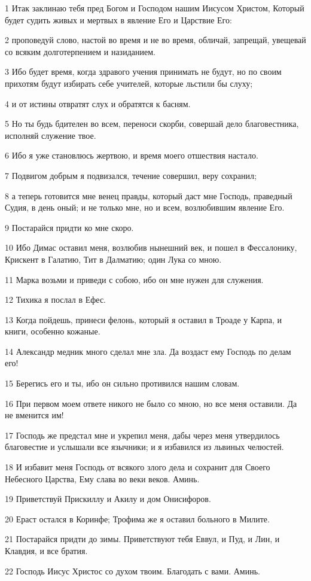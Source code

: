 \par 1 Итак заклинаю тебя пред Богом и Господом нашим Иисусом Христом, Который будет судить живых и мертвых в явление Его и Царствие Его:
\par 2 проповедуй слово, настой во время и не во время, обличай, запрещай, увещевай со всяким долготерпением и назиданием.
\par 3 Ибо будет время, когда здравого учения принимать не будут, но по своим прихотям будут избирать себе учителей, которые льстили бы слуху;
\par 4 и от истины отвратят слух и обратятся к басням.
\par 5 Но ты будь бдителен во всем, переноси скорби, совершай дело благовестника, исполняй служение твое.
\par 6 Ибо я уже становлюсь жертвою, и время моего отшествия настало.
\par 7 Подвигом добрым я подвизался, течение совершил, веру сохранил;
\par 8 а теперь готовится мне венец правды, который даст мне Господь, праведный Судия, в день оный; и не только мне, но и всем, возлюбившим явление Его.
\par 9 Постарайся придти ко мне скоро.
\par 10 Ибо Димас оставил меня, возлюбив нынешний век, и пошел в Фессалонику, Крискент в Галатию, Тит в Далматию; один Лука со мною.
\par 11 Марка возьми и приведи с собою, ибо он мне нужен для служения.
\par 12 Тихика я послал в Ефес.
\par 13 Когда пойдешь, принеси фелонь, который я оставил в Троаде у Карпа, и книги, особенно кожаные.
\par 14 Александр медник много сделал мне зла. Да воздаст ему Господь по делам его!
\par 15 Берегись его и ты, ибо он сильно противился нашим словам.
\par 16 При первом моем ответе никого не было со мною, но все меня оставили. Да не вменится им!
\par 17 Господь же предстал мне и укрепил меня, дабы через меня утвердилось благовестие и услышали все язычники; и я избавился из львиных челюстей.
\par 18 И избавит меня Господь от всякого злого дела и сохранит для Своего Небесного Царства, Ему слава во веки веков. Аминь.
\par 19 Приветствуй Прискиллу и Акилу и дом Онисифоров.
\par 20 Ераст остался в Коринфе; Трофима же я оставил больного в Милите.
\par 21 Постарайся придти до зимы. Приветствуют тебя Еввул, и Пуд, и Лин, и Клавдия, и все братия.
\par 22 Господь Иисус Христос со духом твоим. Благодать с вами. Аминь.


